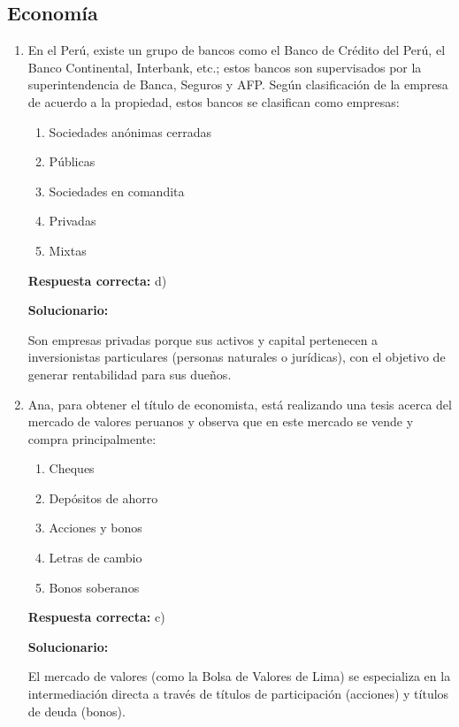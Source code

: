 \subsection*{Economía}

\begin{enumerate}[resume]
	\item En el Perú, existe un grupo de bancos como el Banco de Crédito del Perú, el Banco Continental, Interbank, etc.; estos bancos son supervisados por la superintendencia de Banca, Seguros y AFP. Según clasificación de la empresa de acuerdo a la propiedad, estos bancos se clasifican como empresas:
	\begin{enumerate}[label=\alph*)]
		\item Sociedades anónimas cerradas
		\item Públicas
		\item Sociedades en comandita
		\item Privadas
		\item Mixtas
	\end{enumerate}
	\textbf{Respuesta correcta:} d)

	\vspace{2mm}
	\textbf{Solucionario:}

	Son empresas privadas porque sus activos y capital pertenecen a inversionistas particulares (personas naturales o jurídicas), con el objetivo de generar rentabilidad para sus dueños.

	\vspace{6mm}

	\item Ana, para obtener el título de economista, está realizando una tesis acerca del mercado de valores peruanos y observa que en este mercado se vende y compra principalmente:
	\begin{enumerate}[label=\alph*)]
		\item Cheques
		\item Depósitos de ahorro
		\item Acciones y bonos
		\item Letras de cambio
		\item Bonos soberanos
	\end{enumerate}
	\textbf{Respuesta correcta:} c)

	\vspace{2mm}
	\textbf{Solucionario:}

	El mercado de valores (como la Bolsa de Valores de Lima) se especializa en la intermediación directa a través de títulos de participación (acciones) y títulos de deuda (bonos).


\end{enumerate}
